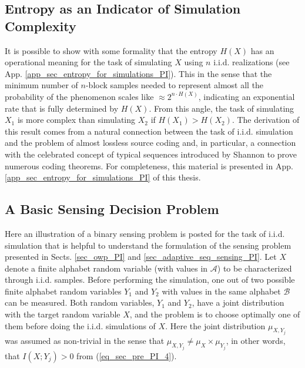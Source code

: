 \subsection{Entropy as an Indicator of Simulation Complexity}
\label{sub_sec_entropy_for_simulations_PI}
It is possible to  show with some formality that the entropy $H(X)$ has an operational meaning for the task of simulating $X$ using $n$ i.i.d. realizations (see App. \ref{app_sec_entropy_for_simulations_PI}). This in the sense that the minimum number of $n$-block samples needed to  represent almost all the probability of the phenomenon scales like $\approx 2^{n\cdot H(X)}$, indicating an exponential rate that is fully  determined by $H(X)$. From this angle, the task of simulating $X_1$ is more complex than simulating $X_2$ if  $H(X_1) > H(X_2)$. The derivation of this result comes from a natural connection between the task of i.i.d. simulation and the problem of almost lossless source coding \citep{cover_2006} and, in particular, a connection with the celebrated concept of typical sequences introduced by Shannon \citep{shannon_1948} to prove numerous coding theorems. For completeness,  this material is presented in App. \ref{app_sec_entropy_for_simulations_PI} of this thesis. 

\subsection{A Basic Sensing Decision Problem}
\label{sub_sec_basic_sensed_problem_PI}
Here an illustration of a binary sensing problem is posted for the task of i.i.d. simulation that is helpful to understand the formulation of the sensing problem presented in Sects. \ref{sec_owp_PI} and \ref{sec_adaptive_seq_sensing_PI}. Let $X$ denote a finite alphabet random variable (with values in $\mathcal{A}$) to be characterized through i.i.d. samples. Before performing the simulation, one out of two possible finite alphabet random variables $Y_1$ and $Y_2$ with values in the same alphabet $\mathcal{B}$ can be measured. Both random variables, $Y_1$ and $Y_2$, have a joint distribution with the target random variable $X$, and the problem is to choose optimally one of them before doing the i.i.d. simulations of $X$. {Here the joint distribution $\mu_{X,Y_j}$ was assumed as non-trivial in the sense that $\mu_{X,Y_j}\neq  \mu_{X}\times \mu_{Y_j}$, in other words, that $I(X; Y_j)>0$ from (\ref{eq_sec_pre_PI_4}).}

